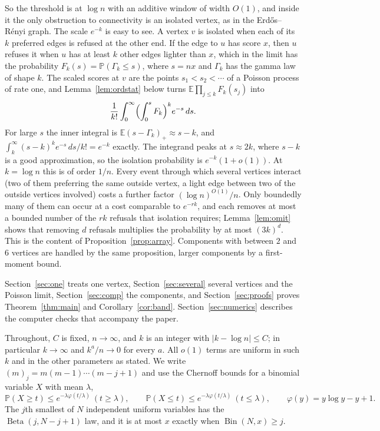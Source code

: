 \documentclass[11pt]{amsart}
\theoremstyle{remark}
\numberwithin{equation}{section}
\newcommand{\E}{\mathbb E}
\newcommand{\Pp}{\mathbb P}
\newcommand{\Bin}{\operatorname{Bin}}
\newcommand{\Bet}{\operatorname{Beta}}
\newcommand{\1}{\mathbf 1}
\begin{document}
So the threshold is at $\log n$ with an additive window of width $O(1)$, and inside it the only obstruction to connectivity is an isolated vertex, as in the Erd\H{o}s--R\'enyi graph. The scale $e^{-k}$ is easy to see. A vertex $v$ is isolated when each of its $k$ preferred edges is refused at the other end. If the edge to $u$ has score $x$, then $u$ refuses it when $u$ has at least $k$ other edges lighter than $x$, which in the limit has the probability $F_k(s)=\Pp(\Gamma_k\le s)$, where $s=nx$ and $\Gamma_k$ has the gamma law of shape $k$. The scaled scores at $v$ are the points $s_1<s_2<\cdots$ of a Poisson process of rate one, and Lemma~\ref{lem:ordstat} below turns $\E\prod_{j\le k}F_k(s_j)$ into
\[
\frac1{k!}\int_0^\infty\Bigl(\int_0^sF_k\Bigr)^ke^{-s}\,ds .
\]
For large $s$ the inner integral is $\E(s-\Gamma_k)_+\approx s-k$, and $\int_k^\infty(s-k)^ke^{-s}\,ds/k!=e^{-k}$ exactly. The integrand peaks at $s\approx2k$, where $s-k$ is a good approximation, so the isolation probability is $e^{-k}(1+o(1))$. At $k=\log n$ this is of order $1/n$. Every event through which several vertices interact (two of them preferring the same outside vertex, a light edge between two of the outside vertices involved) costs a further factor $(\log n)^{O(1)}/n$. Only boundedly many of them can occur at a cost comparable to $e^{-rk}$, and each removes at most a bounded number of the $rk$ refusals that isolation requires; Lemma~\ref{lem:omit} shows that removing $d$ refusals multiplies the probability by at most $(3k)^d$. This is the content of Proposition~\ref{prop:array}. Components with between $2$ and $6$ vertices are handled by the same proposition, larger components by a first-moment bound.

Section~\ref{sec:one} treats one vertex, Section~\ref{sec:several} several vertices and the Poisson limit, Section~\ref{sec:comp} the components, and Section~\ref{sec:proofs} proves Theorem~\ref{thm:main} and Corollary~\ref{cor:band}. Section~\ref{sec:numerics} describes the computer checks that accompany the paper.

Throughout, $C$ is fixed, $n\to\infty$, and $k$ is an integer with $|k-\log n|\le C$; in particular $k\to\infty$ and $k^a/n\to0$ for every $a$. All $o(1)$ terms are uniform in such $k$ and in the other parameters as stated. We write $(m)_j=m(m-1)\cdots(m-j+1)$ and use the Chernoff bounds for a binomial variable $X$ with mean $\lambda$,
\begin{equation}\label{eq:chernoff}
\Pp(X\ge t)\le e^{-\lambda\varphi(t/\lambda)}\ (t\ge\lambda),\qquad
\Pp(X\le t)\le e^{-\lambda\varphi(t/\lambda)}\ (t\le\lambda),\qquad
\varphi(y)=y\log y-y+1 .
\end{equation}
The $j$th smallest of $N$ independent uniform variables has the $\Bet(j,N-j+1)$ law, and it is at most $x$ exactly when $\Bin(N,x)\ge j$.
\end{document}
